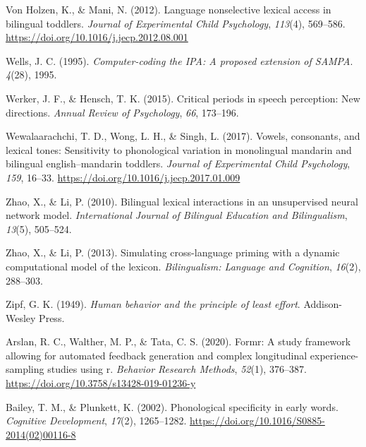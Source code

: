 \documentclass[
]{article}
\newlength{\cslhangindent}
\newlength{\cslentryspacingunit} %
\newenvironment{CSLReferences}[2] %
 {%
  \setlength{\parindent}{0pt}
  \ifodd #1
  \let\oldpar\par
  \def\par{\hangindent=\cslhangindent\oldpar}
  \fi
  \setlength{\parskip}{#2\cslentryspacingunit}
 }%
 {}
\begin{document}
\begin{CSLReferences}{1}{0}
\leavevmode{}%
Von Holzen, K., \& Mani, N. (2012). Language nonselective lexical access
in bilingual toddlers. \emph{Journal of Experimental Child Psychology},
\emph{113}(4), 569--586.
\url{https://doi.org/10.1016/j.jecp.2012.08.001}

\leavevmode{}%
Wells, J. C. (1995). \emph{Computer-coding the {IPA}: A proposed
extension of {SAMPA}}. \emph{4}(28), 1995.

\leavevmode{}%
Werker, J. F., \& Hensch, T. K. (2015). Critical periods in speech
perception: New directions. \emph{Annual Review of Psychology},
\emph{66}, 173--196.

\leavevmode{}%
Wewalaarachchi, T. D., Wong, L. H., \& Singh, L. (2017). Vowels,
consonants, and lexical tones: Sensitivity to phonological variation in
monolingual mandarin and bilingual english--mandarin toddlers.
\emph{Journal of Experimental Child Psychology}, \emph{159}, 16--33.
\url{https://doi.org/10.1016/j.jecp.2017.01.009}

\leavevmode{}%
Zhao, X., \& Li, P. (2010). Bilingual lexical interactions in an
unsupervised neural network model. \emph{International Journal of
Bilingual Education and Bilingualism}, \emph{13}(5), 505--524.

\leavevmode{}%
Zhao, X., \& Li, P. (2013). Simulating cross-language priming with a
dynamic computational model of the lexicon. \emph{Bilingualism: Language
and Cognition}, \emph{16}(2), 288--303.

\leavevmode{}%
Zipf, G. K. (1949). \emph{Human behavior and the principle of least
effort}. Addison-Wesley Press.

\leavevmode{}%
Arslan, R. C., Walther, M. P., \& Tata, C. S. (2020). Formr: A study
framework allowing for automated feedback generation and complex
longitudinal experience-sampling studies using r. \emph{Behavior
Research Methods}, \emph{52}(1), 376--387.
\url{https://doi.org/10.3758/s13428-019-01236-y}

\leavevmode{}%
Bailey, T. M., \& Plunkett, K. (2002). Phonological specificity in early
words. \emph{Cognitive Development}, \emph{17}(2), 1265--1282.
\url{https://doi.org/10.1016/S0885-2014(02)00116-8}


\end{CSLReferences}
\end{document}
